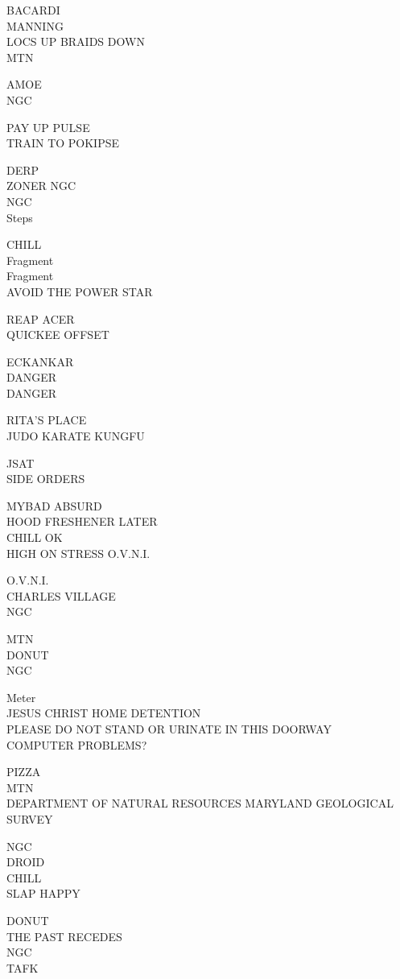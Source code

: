 \documentclass[10pt,letterpaper]{article}
\begin{document}
BACARDI\\
MANNING\\
LOCS UP BRAIDS DOWN\\
MTN

AMOE\\
NGC

PAY UP PULSE\\
TRAIN TO POKIPSE

DERP\\
ZONER NGC\\
NGC\\
Steps

CHILL\\
Fragment\\
Fragment\\
AVOID THE POWER STAR

REAP ACER\\
QUICKEE OFFSET

ECKANKAR\\
DANGER\\
DANGER

RITA'S PLACE\\
JUDO KARATE KUNGFU

JSAT\\
SIDE ORDERS

MYBAD ABSURD\\
HOOD FRESHENER LATER\\
CHILL OK\\
HIGH ON STRESS O.V.N.I.

O.V.N.I.\\
CHARLES VILLAGE\\
NGC

MTN\\
DONUT\\
NGC

Meter\\
JESUS CHRIST HOME DETENTION\\
PLEASE DO NOT STAND OR URINATE IN THIS DOORWAY\\
COMPUTER PROBLEMS?

PIZZA\\
MTN\\
DEPARTMENT OF NATURAL RESOURCES MARYLAND GEOLOGICAL SURVEY

NGC\\
DROID\\
CHILL\\
SLAP HAPPY

DONUT\\
THE PAST RECEDES\\
NGC\\
TAFK
\end{document}
